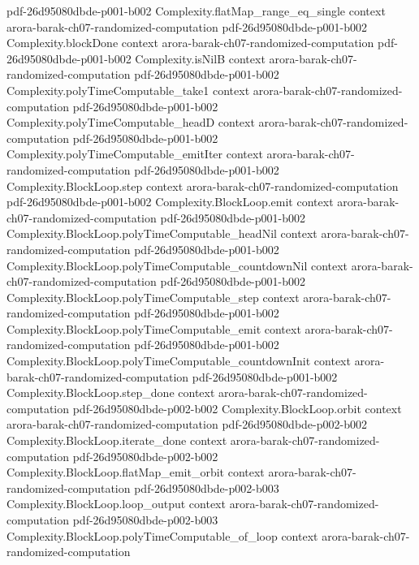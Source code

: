 \begin{theorem}
  {pdf-26d95080dbde-p001-b002}
\proofstep
  {Complexity.flatMap_range_eq_single}
  {context}
  {arora-barak-ch07-randomized-computation}
  {pdf-26d95080dbde-p001-b002}
\proofstep
  {Complexity.blockDone}
  {context}
  {arora-barak-ch07-randomized-computation}
  {pdf-26d95080dbde-p001-b002}
\proofstep
  {Complexity.isNilB}
  {context}
  {arora-barak-ch07-randomized-computation}
  {pdf-26d95080dbde-p001-b002}
\proofstep
  {Complexity.polyTimeComputable_take1}
  {context}
  {arora-barak-ch07-randomized-computation}
  {pdf-26d95080dbde-p001-b002}
\proofstep
  {Complexity.polyTimeComputable_headD}
  {context}
  {arora-barak-ch07-randomized-computation}
  {pdf-26d95080dbde-p001-b002}
\proofstep
  {Complexity.polyTimeComputable_emitIter}
  {context}
  {arora-barak-ch07-randomized-computation}
  {pdf-26d95080dbde-p001-b002}
\proofstep
  {Complexity.BlockLoop.step}
  {context}
  {arora-barak-ch07-randomized-computation}
  {pdf-26d95080dbde-p001-b002}
\proofstep
  {Complexity.BlockLoop.emit}
  {context}
  {arora-barak-ch07-randomized-computation}
  {pdf-26d95080dbde-p001-b002}
\proofstep
  {Complexity.BlockLoop.polyTimeComputable_headNil}
  {context}
  {arora-barak-ch07-randomized-computation}
  {pdf-26d95080dbde-p001-b002}
\proofstep
  {Complexity.BlockLoop.polyTimeComputable_countdownNil}
  {context}
  {arora-barak-ch07-randomized-computation}
  {pdf-26d95080dbde-p001-b002}
\proofstep
  {Complexity.BlockLoop.polyTimeComputable_step}
  {context}
  {arora-barak-ch07-randomized-computation}
  {pdf-26d95080dbde-p001-b002}
\proofstep
  {Complexity.BlockLoop.polyTimeComputable_emit}
  {context}
  {arora-barak-ch07-randomized-computation}
  {pdf-26d95080dbde-p001-b002}
\proofstep
  {Complexity.BlockLoop.polyTimeComputable_countdownInit}
  {context}
  {arora-barak-ch07-randomized-computation}
  {pdf-26d95080dbde-p001-b002}
\proofstep
  {Complexity.BlockLoop.step_done}
  {context}
  {arora-barak-ch07-randomized-computation}
  {pdf-26d95080dbde-p002-b002}
\proofstep
  {Complexity.BlockLoop.orbit}
  {context}
  {arora-barak-ch07-randomized-computation}
  {pdf-26d95080dbde-p002-b002}
\proofstep
  {Complexity.BlockLoop.iterate_done}
  {context}
  {arora-barak-ch07-randomized-computation}
  {pdf-26d95080dbde-p002-b002}
\proofstep
  {Complexity.BlockLoop.flatMap_emit_orbit}
  {context}
  {arora-barak-ch07-randomized-computation}
  {pdf-26d95080dbde-p002-b003}
\proofstep
  {Complexity.BlockLoop.loop_output}
  {context}
  {arora-barak-ch07-randomized-computation}
  {pdf-26d95080dbde-p002-b003}
\proofstep
  {Complexity.BlockLoop.polyTimeComputable_of_loop}
  {context}
  {arora-barak-ch07-randomized-computation}

\end{theorem}
